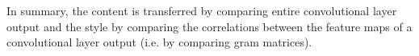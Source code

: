 In summary, the content is transferred by comparing entire convolutional layer output and the style by comparing the correlations between the feature maps of a convolutional layer output (i.e. by comparing gram matrices).





